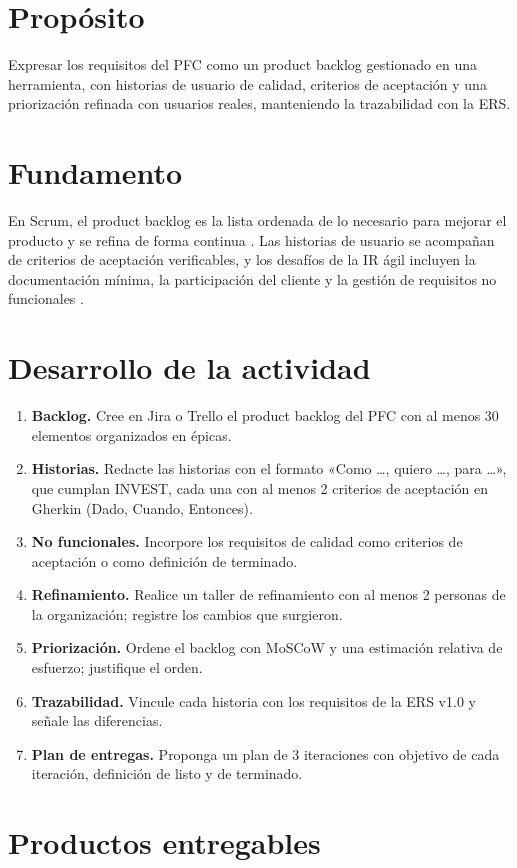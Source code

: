 \documentclass[11pt]{article}
\newcommand{\seccion}[1]{\section{\textcolor{utegreendk}{#1}}}
\begin{document}
\seccion{Propósito}

Expresar los requisitos del PFC como un product backlog gestionado en una herramienta, con historias de usuario de calidad, criterios de aceptación y una priorización refinada con usuarios reales, manteniendo la trazabilidad con la ERS.

\seccion{Fundamento}

En Scrum, el product backlog es la lista ordenada de lo necesario para mejorar el producto y se refina de forma continua \citep{scrumguide_2020}. Las historias de usuario se acompañan de criterios de aceptación verificables, y los desafíos de la IR ágil incluyen la documentación mínima, la participación del cliente y la gestión de requisitos no funcionales \citep{hoy_agile_re_2023,ireb_cpre_fl_2026}.

\seccion{Desarrollo de la actividad}

\begin{enumerate}[leftmargin=20pt,itemsep=4pt]
	\item \textbf{Backlog.} Cree en Jira o Trello el product backlog del PFC con al menos 30 elementos organizados en épicas.
	\item \textbf{Historias.} Redacte las historias con el formato «Como \ldots, quiero \ldots, para \ldots», que cumplan INVEST, cada una con al menos 2 criterios de aceptación en Gherkin (Dado, Cuando, Entonces).
	\item \textbf{No funcionales.} Incorpore los requisitos de calidad como criterios de aceptación o como definición de terminado.
	\item \textbf{Refinamiento.} Realice un taller de refinamiento con al menos 2 personas de la organización; registre los cambios que surgieron.
	\item \textbf{Priorización.} Ordene el backlog con MoSCoW y una estimación relativa de esfuerzo; justifique el orden.
	\item \textbf{Trazabilidad.} Vincule cada historia con los requisitos de la ERS v1.0 y señale las diferencias.
	\item \textbf{Plan de entregas.} Proponga un plan de 3 iteraciones con objetivo de cada iteración, definición de listo y de terminado.
\end{enumerate}

\seccion{Productos entregables}
\end{document}
